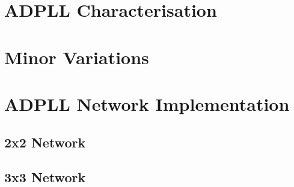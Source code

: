 \section{\acs{ADPLL} Characterisation}

\section{Minor Variations}\label{section:minor_variations}

\section{\acs{ADPLL} Network Implementation}
\subsection{2x2 Network}
\subsection{3x3 Network}
